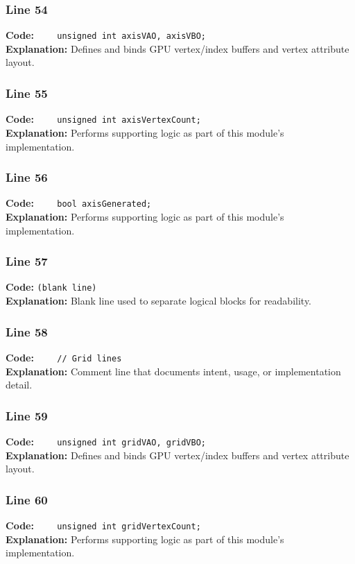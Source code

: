 \documentclass[11pt,a4paper]{article}
\begin{document}
\subsubsection*{Line 54}
\textbf{Code:} \verb|    unsigned int axisVAO, axisVBO;|\\
\textbf{Explanation:} Defines and binds GPU vertex/index buffers and vertex attribute layout.

\subsubsection*{Line 55}
\textbf{Code:} \verb|    unsigned int axisVertexCount;|\\
\textbf{Explanation:} Performs supporting logic as part of this module's implementation.

\subsubsection*{Line 56}
\textbf{Code:} \verb|    bool axisGenerated;|\\
\textbf{Explanation:} Performs supporting logic as part of this module's implementation.

\subsubsection*{Line 57}
\textbf{Code:} \texttt{(blank line)}\\
\textbf{Explanation:} Blank line used to separate logical blocks for readability.

\subsubsection*{Line 58}
\textbf{Code:} \verb|    // Grid lines|\\
\textbf{Explanation:} Comment line that documents intent, usage, or implementation detail.

\subsubsection*{Line 59}
\textbf{Code:} \verb|    unsigned int gridVAO, gridVBO;|\\
\textbf{Explanation:} Defines and binds GPU vertex/index buffers and vertex attribute layout.

\subsubsection*{Line 60}
\textbf{Code:} \verb|    unsigned int gridVertexCount;|\\
\textbf{Explanation:} Performs supporting logic as part of this module's implementation.
\end{document}
